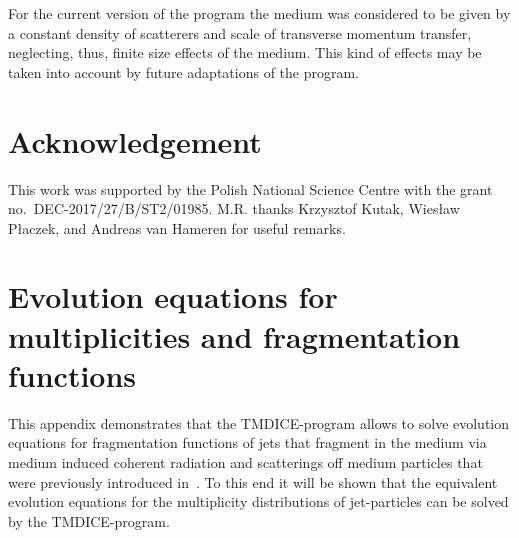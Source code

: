 \documentclass[preprint,12pt]{elsarticle}
\newcommand{\tmdice}{{\sf TMDICE}}
\begin{document}
For the current version of the program the medium was considered to be given by a constant density of scatterers and scale of transverse momentum transfer, neglecting, thus, finite size effects of the medium. 
This kind of effects may be taken into account by future adaptations of the program.

\section*{Acknowledgement}
This work was supported by the Polish National Science Centre with the grant no.\ DEC-2017/27/B/ST2/01985. 
M.R. thanks Krzysztof Kutak, Wies\l{}aw P\l{}aczek, and Andreas van Hameren for useful remarks.
\appendix
\section{Evolution equations for multiplicities and fragmentation functions}
\label{appA}
%
This appendix demonstrates that the \tmdice-program allows to solve evolution equations for fragmentation functions of jets that fragment in the medium via medium induced coherent radiation and scatterings off medium particles that were previously introduced in~\cite{Blaizot:2012fh,Blaizot:2013vha,Blanco:2021usa}. To this end it will be shown that the equivalent evolution equations for the multiplicity distributions of jet-particles can be solved by the \tmdice-program.
\end{document}
